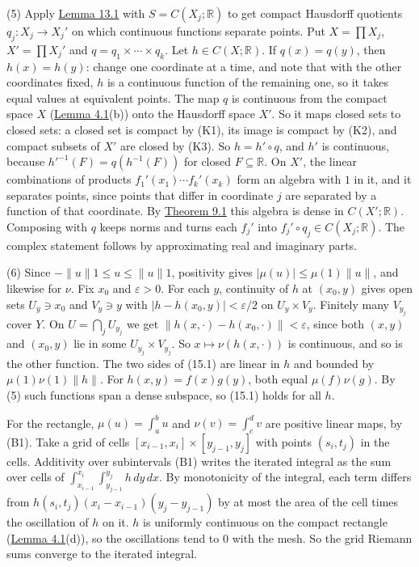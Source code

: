 \documentclass[
  english,
  11pt,
  a4paper,
]{article}
\begin{document}
(5) Apply
\hyperlink{the-stone-weierstrass-theorem-for-functions-vanishing-at-infinity--oa-fnd-sw-12}{Lemma
13.1} with \(S=C(X_j;\mathbb R)\) to get compact Hausdorff quotients
\(q_j:X_j\to X_j'\) on which continuous functions separate points. Put
\(X=\prod X_j\), \(X'=\prod X_j'\) and \(q=q_1\times\cdots\times q_k\).
Let \(h\in C(X;\mathbb R)\). If \(q(x)=q(y)\), then \(h(x)=h(y)\):
change one coordinate at a time, and note that with the other
coordinates fixed, \(h\) is a continuous function of the remaining one,
so it takes equal values at equivalent points. The map \(q\) is
continuous from the compact space \(X\)
(\hyperlink{the-stone-weierstrass-theorem-for-functions-vanishing-at-infinity--oa-fnd-sw-15}{Lemma
4.1}(b)) onto the Hausdorff space \(X'\). So it maps closed sets to
closed sets: a closed set is compact by (K1), its image is compact by
(K2), and compact subsets of \(X'\) are closed by (K3). So
\(h=h'\circ q\), and \(h'\) is continuous, because
\(h'^{-1}(F)=q(h^{-1}(F))\) for closed \(F\subseteq\mathbb R\). On
\(X'\), the linear combinations of products
\(f_1'(x_1)\cdots f_k'(x_k)\) form an algebra with \(1\) in it, and it
separates points, since points that differ in coordinate \(j\) are
separated by a function of that coordinate. By
\hyperlink{the-stone-weierstrass-theorem-for-functions-vanishing-at-infinity--oa-fnd-sw-07}{Theorem
9.1} this algebra is dense in \(C(X';\mathbb R)\). Composing with \(q\)
keeps norms and turns each \(f_j'\) into
\(f_j'\circ q_j\in C(X_j;\mathbb R)\). The complex statement follows by
approximating real and imaginary parts.

(6) Since \(-\|u\|1\leq u\leq\|u\|1\), positivity gives
\(|\mu(u)|\leq\mu(1)\|u\|\), and likewise for \(\nu\). Fix \(x_0\) and
\(\varepsilon>0\). For each \(y\), continuity of \(h\) at \((x_0,y)\)
gives open sets \(U_y\ni x_0\) and \(V_y\ni y\) with
\(|h-h(x_0,y)|<\varepsilon/2\) on \(U_y\times V_y\). Finitely many
\(V_{y_j}\) cover \(Y\). On \(U=\bigcap_jU_{y_j}\) we get
\(\|h(x,\cdot)-h(x_0,\cdot)\|<\varepsilon\), since both \((x,y)\) and
\((x_0,y)\) lie in some \(U_{y_j}\times V_{y_j}\). So
\(x\mapsto\nu(h(x,\cdot))\) is continuous, and so is the other function.
The two sides of (15.1) are linear in \(h\) and bounded by
\(\mu(1)\nu(1)\|h\|\). For \(h(x,y)=f(x)g(y)\), both equal
\(\mu(f)\nu(g)\). By (5) such functions span a dense subspace, so (15.1)
holds for all \(h\).

For the rectangle, \(\mu(u)=\int_a^bu\) and \(\nu(v)=\int_c^dv\) are
positive linear maps, by (B1). Take a grid of cells
\([x_{i-1},x_i]\times[y_{j-1},y_j]\) with points \((s_i,t_j)\) in the
cells. Additivity over subintervals (B1) writes the iterated integral as
the sum over cells of
\(\int_{x_{i-1}}^{x_i}\int_{y_{j-1}}^{y_j}h\,dy\,dx\). By monotonicity
of the integral, each term differs from
\(h(s_i,t_j)(x_i-x_{i-1})(y_j-y_{j-1})\) by at most the area of the cell
times the oscillation of \(h\) on it. \(h\) is uniformly continuous on
the compact rectangle
(\hyperlink{the-stone-weierstrass-theorem-for-functions-vanishing-at-infinity--oa-fnd-sw-15}{Lemma
4.1}(d)), so the oscillations tend to \(0\) with the mesh. So the grid
Riemann sums converge to the iterated integral.
\end{document}
